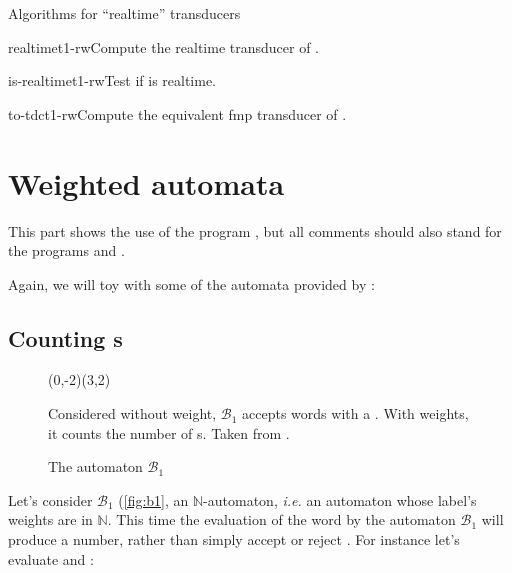 \begin{fnsection}{Algorithms for ``realtime'' transducers}
\item{realtime}{t1-rw}{Compute the realtime transducer of  .}
\item{is-realtime}{t1-rw}{Test if  is realtime.}
\item{to-tdc}{t1-rw}{Compute the equivalent fmp transducer of .}
\hline
\end{fnsection}

\newpage
\section{Weighted automata}

This part shows the use of the program , but
all comments should also stand for the programs
 and .

Again, we will toy with some of the automata provided by
:

\subsection{Counting s}

\begin{figure}[tp] \centering
  \begin{VCPicture}{(0,-2)(3,2)}
     
  \end{VCPicture}
  \begin{legend}
    Considered without weight, $\mathcal{B}_1$ accepts words with a
    .  With weights, it counts the number of s.  Taken
    from \citet[Fig. III.2.2, p.
    434]{sakarovitch.03.eta}.
  \end{legend}
  \caption{The automaton $\mathcal{B}_1$}
  \label{fig:b1}
\end{figure}

Let's consider $\mathcal{B}_1$ (\autoref{fig:b1}, an
$\mathbb{N}$-automaton,
\textit{i.e.}  an automaton whose label's weights are in $\mathbb{N}$.
This time the evaluation of the word  by the automaton
$\mathcal{B}_1$ will produce a number, rather than simply accept or
reject .  For instance let's evaluate  and
:

